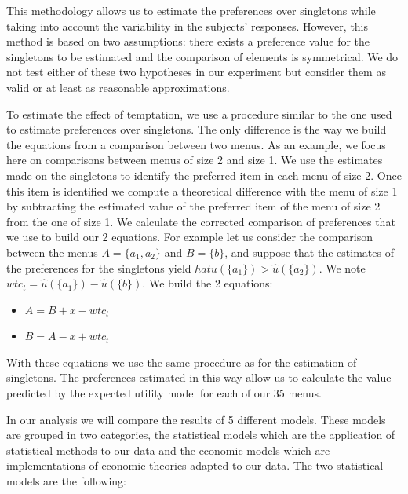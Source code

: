 \documentclass[
]{book}
\providecommand{\tightlist}{%
  \setlength{\itemsep}{0pt}\setlength{\parskip}{0pt}}
\begin{document}
This methodology allows us to estimate the preferences over singletons while
taking into account the variability in the subjects' responses.
However, this method is based on two assumptions:
there exists a preference value for the singletons to
be estimated and the comparison of elements is symmetrical.
We do not test either of these two hypotheses in our experiment but consider
them as valid or at least as reasonable approximations.

To estimate the effect of temptation, we use a procedure similar to the one used
to estimate preferences over singletons.
The only difference is the way we build the equations from a comparison between
two menus.
As an example, we focus here on comparisons between menus of size 2 and size 1.
We use the estimates made on the singletons to identify the preferred item in
each menu of size 2. Once this item is identified we compute a theoretical
difference with the menu of size 1 by subtracting the estimated value of the
preferred item of the menu of size 2 from the one of size 1.
We calculate the corrected comparison of preferences that we use to build our 2
equations.
For example let us consider the comparison between the menus \(A = \{a_1, a_2\}\)
and \(B = \{b\}\), and suppose that the estimates of the preferences for the
singletons yield \(hat{u}(\{a_1\}) > \hat{u}(\{a_2\})\).
We note \(wtc_t = \hat{u}(\{a_1\}) - \hat{u}(\{b\})\).
We build the 2 equations:

\begin{itemize}
\tightlist
\item
  \(A = B + x - wtc_t\)
\item
  \(B = A - x + wtc_t\)
\end{itemize}

With these equations we use the same procedure as for the estimation of
singletons.
The preferences estimated in this way allow us to calculate the value predicted
by the expected utility model for each of our 35 menus.

In our analysis we will compare the results of 5 different models.
These models are grouped in two categories, the statistical models which are the
application of statistical methods to our data and the economic models which are
implementations of economic theories adapted to our data.
The two statistical models are the following:
\end{document}

